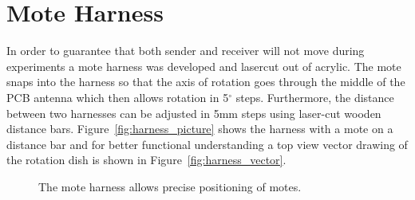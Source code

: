 \section{Mote Harness}

In order to guarantee that both sender and receiver will not move during experiments a mote harness was developed and lasercut out of acrylic.
The mote snaps into the harness so that the axis of rotation goes through the middle of the PCB antenna which then allows rotation in 5$^\circ$ steps.
Furthermore, the distance between two harnesses can be adjusted in 5mm steps using laser-cut wooden distance bars.
Figure~\ref{fig:harness_picture} shows the harness with a mote on a distance bar and for better functional understanding a top view vector drawing of the rotation dish is shown in Figure~\ref{fig:harness_vector}.

\begin{figure}[ht]
	\caption{The mote harness allows precise positioning of motes.}
	\label{fig:8mote_bit_errors_simulation}
\end{figure}


